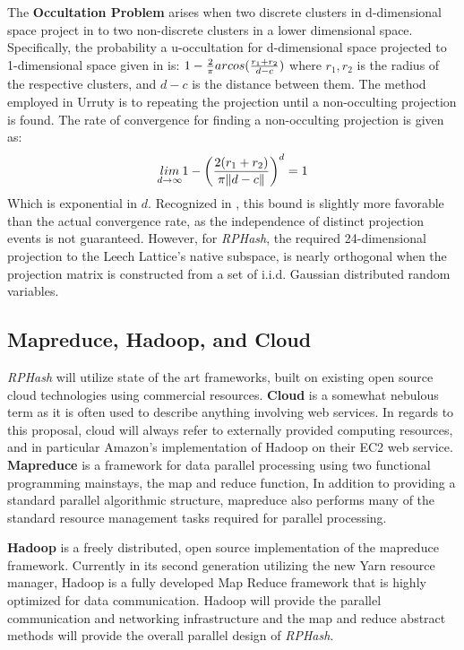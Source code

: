\documentclass[a4paper,10pt]{article}
\begin{document}
The \textbf{Occultation Problem} arises when two discrete clusters in
d-dimensional space project in to two non-discrete clusters in a lower
dimensional space.  Specifically, the probability a u-occultation for
d-dimensional space projected to 1-dimensional space given in \cite{Urruty2007}
is: $1-{2 \over \pi} arcos({{r_1+r_2}\over{d-c}}) $ where $r_1,r_2$ is the
radius of the respective clusters, and $d-c$ is the distance between them.
The method employed in Urruty\cite{Urruty2007} is to repeating the projection
until a non-occulting projection is found.  The rate of convergence for
finding a non-occulting projection is given as: $$\underset {d\rightarrow
\infty}{lim}1-\bigg({{2(r_1+r_2)}\over {\pi \|d-c\|}}\bigg)^d = 1$$ Which is
exponential in $d$.  Recognized in \cite{Urruty2007}, this bound is slightly
more favorable than the actual convergence rate, as the independence of
distinct projection events is not guaranteed.  However, for \emph{RPHash},
the required 24-dimensional projection to the Leech Lattice's native subspace,
is nearly orthogonal when the projection matrix is constructed from a set
of i.i.d.  Gaussian distributed random variables\cite{vempala}.


\subsection{Mapreduce, Hadoop, and Cloud}
 \emph{RPHash} will utilize state of the art frameworks, built on existing
 open source cloud technologies using commercial resources.
\textbf{Cloud} is a somewhat nebulous term as it is often used to describe
anything involving web services.  In regards to this proposal, cloud will
always refer to externally provided computing resources, and in particular
Amazon's implementation of Hadoop on their EC2 web service.  \textbf{Mapreduce}
is a framework for data parallel processing using two functional programming
mainstays, the map and reduce function, In addition to providing a standard
parallel algorithmic structure, mapreduce also performs many of the standard
resource management tasks required for parallel processing.

\textbf{Hadoop} is a freely distributed, open source implementation of the
mapreduce framework.  Currently in its second generation utilizing the new
Yarn resource manager, Hadoop is a fully developed Map Reduce framework
that is highly optimized for data communication.  Hadoop will provide the
parallel communication and networking infrastructure and the map and reduce
abstract methods will provide the overall parallel design of \emph{RPHash}.
\end{document}
